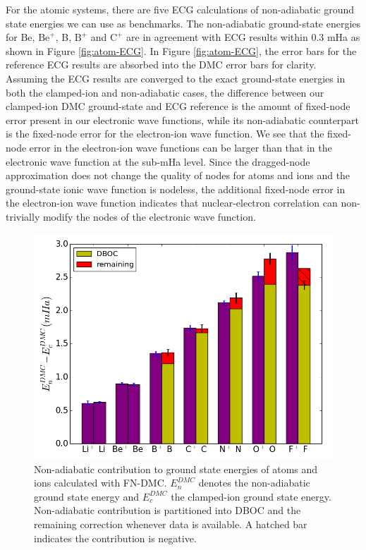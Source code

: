\documentclass[pra,superscriptaddress,groupedaddress,twocolumn]{revtex4}
\begin{document}
For the atomic systems, there are five ECG calculations of non-adiabatic ground state energies we can use as benchmarks. The non-adiabatic ground-state energies for Be, $\text{Be}^+$, B, $\text{B}^+$ and $\text{C}^+$ are in agreement with ECG results within 0.3 mHa as shown in Figure \ref{fig:atom-ECG}. In Figure \ref{fig:atom-ECG}, the error bars for the reference ECG results are absorbed into the DMC error bars for clarity. Assuming the ECG results are converged to the exact ground-state energies in both the clamped-ion and non-adiabatic cases, the difference between our clamped-ion DMC ground-state and ECG reference is the amount of fixed-node error present in our electronic wave functions, while its non-adiabatic counterpart is the fixed-node error for the electron-ion wave function. We see that the fixed-node error in the electron-ion wave functions can be larger than that in the electronic wave function at the sub-mHa level. Since the dragged-node approximation does not change the quality of nodes for atoms and ions and the ground-state ionic wave function is nodeless, the additional fixed-node error in the electron-ion wave function indicates that nuclear-electron correlation can non-trivially modify the nodes of the electronic wave function.

\begin{figure}[h]
\includegraphics[scale=.37]{Figures/atom-nad-ad}
\caption{Non-adiabatic contribution to ground state energies of atoms and ions calculated with FN-DMC. $E_n^{DMC}$ denotes the non-adiabatic ground state energy and $E_c^{DMC}$ the clamped-ion ground state energy. Non-adiabatic contribution is partitioned into DBOC and the remaining correction whenever data is available. A hatched bar indicates the contribution is negative. \label{fig:atom-nad-ad}} %
\end{figure}
\end{document}
